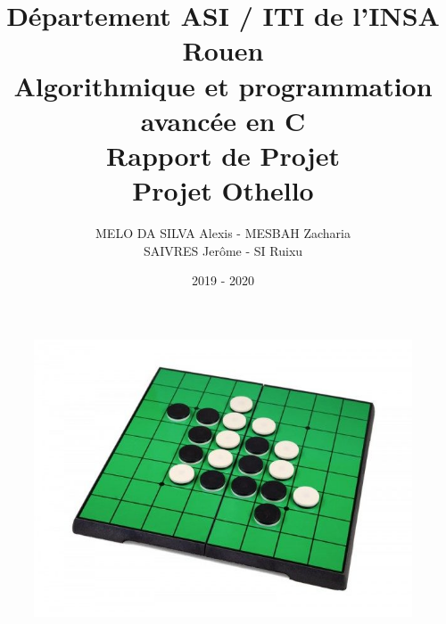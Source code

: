 \title{Département ASI / ITI de l'INSA Rouen \\
	Algorithmique et programmation avancée en C\\
	Rapport de Projet\\
	Projet Othello}
\author{MELO DA SILVA Alexis - MESBAH Zacharia\\
SAIVRES Jerôme - SI Ruixu}
\date{2019 - 2020}
\maketitle
\begin{figure}[h]
	\centering
	\includegraphics[width=12cm]{./sourcesIMAGES/othello.jpg}
\end{figure}